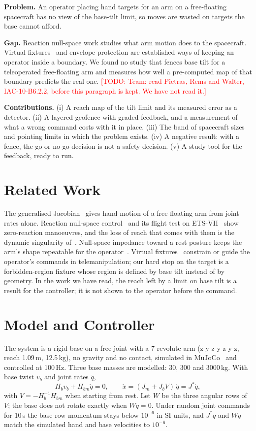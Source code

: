 \documentclass[conference]{IEEEtran}
\newcommand{\todo}[1]{\textcolor{red}{[TODO: #1]}}
\newcommand{\qd}{\dot{q}}
\begin{document}
\textbf{Problem.} An operator placing hand targets for an arm on a free-floating spacecraft has no view of
the base-tilt limit, so moves are wasted on targets the base cannot afford.

\textbf{Gap.} Reaction null-space work studies what arm motion does to the spacecraft. Virtual
fixtures~\cite{rosenberg1993,abbott2007} and envelope protection are established ways of keeping an operator
inside a boundary. We found no study that fences base tilt for a teleoperated free-floating arm and
measures how well a pre-computed map of that boundary predicts the real one. \todo{Team: read Pietras, Rems
and Walter, IAC-10-B6.2.2, before this paragraph is kept. We have not read it.}

\textbf{Contributions.} (i) A reach map of the tilt limit and its measured error as a detector. (ii) A
layered geofence with graded feedback, and a measurement of what a wrong command costs with it in place.
(iii) The band of spacecraft sizes and pointing limits in which the problem exists. (iv) A negative result:
with a fence, the go or no-go decision is not a safety decision. (v) A study tool for the feedback, ready
to run.

\section{Related Work}
The generalised Jacobian~\cite{umetani1989} gives hand motion of a free-floating arm from joint rates
alone. Reaction null-space control~\cite{nenchev1999} and its flight test on ETS-VII~\cite{yoshida2001}
show zero-reaction manoeuvres, and the loss of reach that comes with them is the dynamic singularity
of~\cite{dubowsky1993}. Null-space impedance toward a rest posture keeps the arm's shape repeatable for the
operator~\cite{hogan1985,dragan2013}. Virtual fixtures~\cite{rosenberg1993,abbott2007} constrain or guide
the operator's commands in telemanipulation; our hard stop on the target is a forbidden-region fixture
whose region is defined by base tilt instead of by geometry. In the work we have read, the reach left by
a limit on base tilt is a result for the controller; it is not shown to the operator before the command.

\section{Model and Controller}
The system is a rigid base on a free joint with a 7-revolute arm (z-y-z-y-z-y-z, reach 1.09\,m, 12.5\,kg),
no gravity and no contact, simulated in MuJoCo~\cite{todorov2012} and controlled at 100\,Hz. Three base
masses are modelled: 30, 300 and 3000\,kg. With base twist $v_b$ and joint rates $\qd$,
\begin{equation}
H_b v_b + H_{bm}\qd = 0 ,\qquad \dot{x} = (J_m + J_b V)\,\qd = J^{*}\qd ,
\end{equation}
with $V=-H_b^{-1}H_{bm}$ when starting from rest. Let $W$ be the three angular rows of $V$; the base does
not rotate exactly when $W\qd=0$. Under random joint commands for 10\,s the base-row momentum stays below
$10^{-6}$ in SI units, and $J^{*}\qd$ and $W\qd$ match the simulated hand and base velocities to $10^{-6}$.
\end{document}
